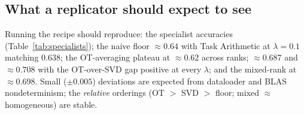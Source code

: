 \subsection{What a replicator should expect to see}
Running the recipe should reproduce: the specialist accuracies (Table~\ref{tab:specialists}); the naive
floor $\approx0.64$ with Task Arithmetic at $\lambda{=}0.1$ matching $0.638$; the OT-averaging plateau at
$\approx0.62$ across ranks; \svdties{}$\approx0.687$ and \otties{}$\approx0.708$ with the OT-over-SVD gap
positive at every $\lambda$; and the mixed-rank \otties{} at $\approx0.698$. Small ($\pm0.005$) deviations
are expected from dataloader and BLAS nondeterminism; the \emph{relative} orderings (OT $>$ SVD $>$ floor;
mixed $\approx$ homogeneous) are stable.
